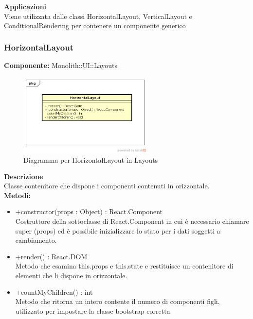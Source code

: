 \textbf{Applicazioni}\\
Viene utilizzata dalle classi HorizontalLayout, VerticalLayout e ConditionalRendering per contenere un componente generico 


\clearpage

\subsubsection{HorizontalLayout}
\textbf{Componente:}  Monolith::UI::Layouts\\
   \FloatBarrier
   \begin{figure}[ht]
   \centering
   \includegraphics[width=0.6\textwidth]{img/single-HorizontalLayout.png}
   \caption{{Diagramma per HorizontalLayout in Layouts}}
\end{figure}
\FloatBarrier
\textbf{Descrizione}\\
Classe contenitore che dispone i componenti contenuti in orizzontale. \\
\textbf{Metodi:}
\begin{itemize}

\item +constructor(props : Object) : React.Component 
\\
Costruttore della sottoclasse di React.Component in cui è necessario chiamare super (props) ed è possibile inizializzare lo stato per i dati soggetti a cambiamento.

\item +render() : React.DOM 
\\
Metodo che esamina this.props e this.state e restituisce un contenitore di elementi che li dispone in orizzontale.

\item +countMyChildren() : int \\
Metodo che ritorna un intero contente il numero di componenti figli, utilizzato per impostare la classe bootstrap corretta.

\end{itemize}

